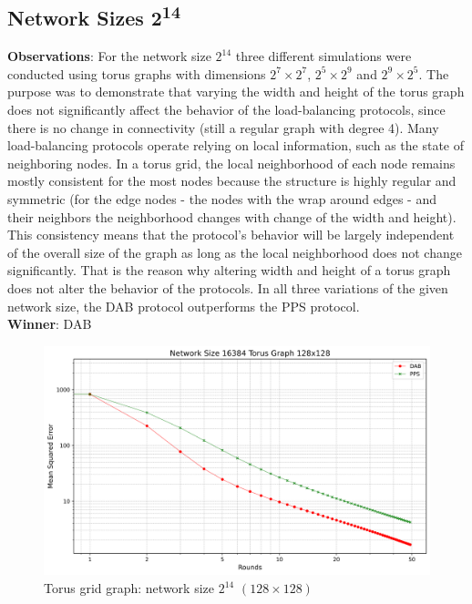 \subsection{Network Sizes 2\textsuperscript{14}}
\textbf{Observations}: For the network size $2^{14}$ three different simulations were conducted using torus graphs with dimensions $2^{7} \times 2^{7}$, $2^{5} \times 2^{9}$ and $2^{9} \times 2^{5}$. The purpose was to demonstrate that varying the width and height of the torus graph does not significantly affect the behavior of the load-balancing protocols, since there is no change in connectivity (still a regular graph with degree 4). Many load-balancing protocols operate relying on local information, such as the state of neighboring nodes. In a torus grid, the local neighborhood of each node remains mostly consistent for the most nodes because the structure is highly regular and symmetric (for the edge nodes - the nodes with the wrap around edges - and their neighbors the neighborhood changes with change of the width and height). This consistency means that the protocol's behavior will be largely independent of the overall size of the graph as long as the local neighborhood does not change significantly. That is the reason why altering width and height of a torus graph does not alter the behavior of the protocols. In all three variations of the given network size, the DAB protocol outperforms the PPS protocol.\\
\textbf{Winner}: DAB
\begin{figure}[H]
    \centering
    \includegraphics[scale=0.5]{figures/torusGridGraphSimulations/128x128/DAB_vs_PPS_TG_r50_n16384.png}
    \caption{Torus grid graph: network size $2^{14}$ $(128\times128)$}
    \label{fig:16384torusGraph}
\end{figure}

